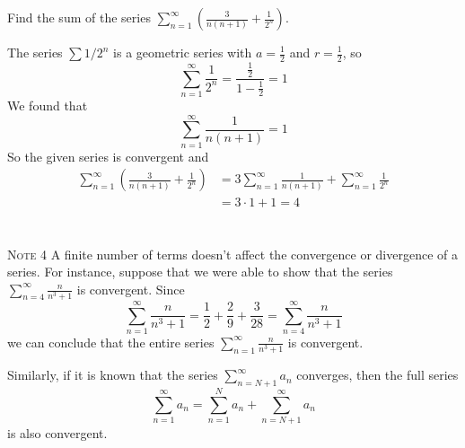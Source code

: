   \begin{example}
    Find the sum of the series $\displaystyle\sum_{n=1}^{\infty} \left(\frac{3}{n(n+1)} + \frac{1}{2^n}\right)$.
  \end{example}
  \begin{solution}
    The series $\sum 1/2^n$ is a geometric series with $a=\frac{1}{2}$ and $r=\frac{1}{2}$, so
    $$ \sum_{n=1}^{\infty} \frac{1}{2^n} = \frac{\frac{1}{2}}{1-\frac{1}{2}} = 1$$
    We found that
    $$ \sum_{n=1}^{\infty} \frac{1}{n(n+1)} = 1$$
    So the given series is convergent and
    \begin{align*}
      \sum_{n=1}^{\infty} \left(\frac{3}{n(n+1)} + \frac{1}{2^n}\right) &= 3\sum_{n=1}^{\infty} \frac{1}{n(n+1)} + \sum_{n=1}^{\infty} \frac{1}{2^n} \\
      &= 3 \cdot 1 + 1 = 4
    \end{align*}
    \\~\\
    \textsc{Note 4} A finite number of terms doesn't affect the convergence or divergence of a series. For instance, suppose that we were able to show that the series $\displaystyle\sum_{n=4}^{\infty} \frac{n}{n^3 + 1}$ is convergent. Since
    $$ \sum_{n=1}^{\infty} \frac{n}{n^3 + 1} = \frac{1}{2} + \frac{2}{9} + \frac{3}{28} = \sum_{n=4}^{\infty} \frac{n}{n^3 + 1}$$
    we can conclude that the entire series $\displaystyle\sum_{n=1}^{\infty} \frac{n}{n^3 + 1}$ is convergent.
    \par
    Similarly, if it is known that the series $\displaystyle\sum_{n=N+1}^{\infty} a_n$ converges, then the full series
    $$\sum_{n=1}^{\infty} a_n = \sum_{n=1}^{N} a_n + \sum_{n=N+1}^{\infty} a_n$$
    is also convergent.
  \end{solution}


